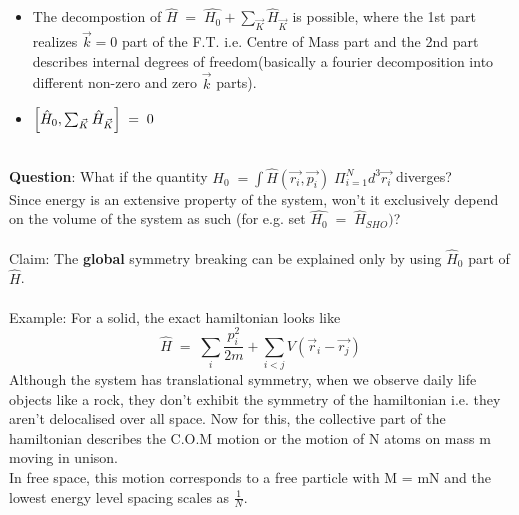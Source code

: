 \documentclass[12pt]{article}
\begin{document}
\begin{itemize}
    \item The decompostion of $\hat{H}\;=\;\hat{H_0} + \sum_{\Vec{K}}\hat{H}_{\Vec{K}}$ is possible, where the 1st part realizes $\Vec{k}=0$ part of the F.T. i.e. Centre of Mass part and the 2nd part describes internal degrees of freedom(basically a fourier decomposition into different non-zero and zero $\Vec{k}$ parts).
    \item $\comm{\hat{H}_0}{\sum_{\Vec{K}}\hat{H}_{\Vec{K}}}\;=\;0$
\end{itemize}\\
\textbf{Question}: What if the quantity $H_0\;=\int \hat{H}(\Vec{r_i},\Vec{p_i})\; \Pi_{i=1}^N d^3\Vec{r_i}$ diverges?\\ Since energy is an extensive property of the system, won't it exclusively depend on the volume of the system as such (for e.g. set $\hat{H_0}\;=\;\hat{H}_{SHO})$?\\
\\
Claim: The \textbf{global} symmetry breaking can be explained only by using $\hat{H}_0$ part of $\hat{H}$.\\
\\
Example: For a solid, the exact hamiltonian looks like 
$$\hat{H}\;=\;\sum_i \frac{p_i^2}{2m}+\sum_{i<j}V(\Vec{r}_i-\Vec{r_j})$$
Although the system has translational symmetry, when we observe daily life objects like a rock, they don't exhibit the symmetry of the hamiltonian i.e. they aren't delocalised over all space. Now for this, the collective part of the hamiltonian describes the C.O.M motion or the motion of N atoms on mass m moving in unison.\\
In free space, this motion corresponds to a free particle with M = mN and the lowest energy level spacing scales as $\frac{1}{N}$.\\
\end{document}

